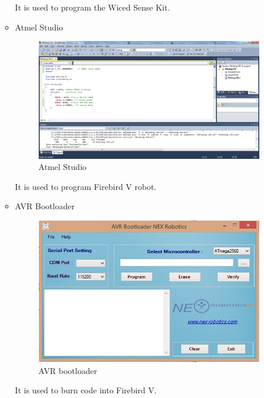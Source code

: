 \documentclass[a4paper,12pt,oneside]{book}
\begin{document}
\begin{itemize}
\begin{itemize}
	    It is used to program the Wiced Sense Kit.
	\\
   \item Atmel Studio 
            \begin{figure}[h]
        \centering
    	\includegraphics[scale=0.3]{atmel.jpg}
    	\caption{Atmel Studio}
	    \end{figure}
	    
	    It is used to program Firebird V robot.
	    
	    \newpage 
	     \item AVR Bootloader
	     \begin{figure}[h]
        \centering
    	\includegraphics[scale=0.4]{avr.JPG}
    	\caption{AVR bootloader}
	    \end{figure}
  
  It is used to burn code into Firebird V.
  

\end{itemize}
\end{itemize}
\end{document}
